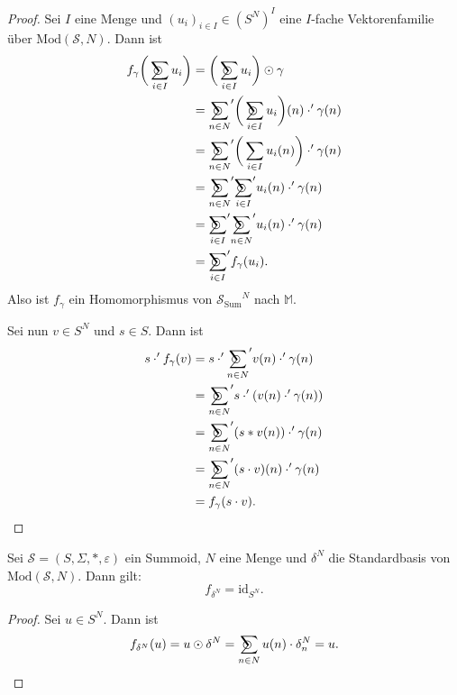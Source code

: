 \documentclass{article}
\DeclareMathOperator*{\sumcirc}{%
  \ThisStyle{\mathop{\ensurestackMath{\stackinset{c}{-1.5\LMpt}{c}{}{%
  \rotatebox[origin=lb]{-90}{$\SavedStyle\scalerel*{\bm\Circle}{%
  i}$}}{\SavedStyle\sum}}}}}
\begin{document}
\begin{proof}
  Sei $I$ eine Menge und $(u_i)_{i \in I} \in (S^N)^I$ eine $I$-fache Vektorenfamilie über $\text{Mod}(\mathcal{S}, N)$.
  Dann ist
  \begin{align*}
    f_\gamma\bigg(\sumcirc_{i \in I} u_i\bigg)
    &= \bigg(\sumcirc_{i \in I} u_i\bigg) \odot \gamma \\
    &= {\sumcirc_{n \in N}}' \bigg(\sumcirc_{i \in I} u_i\bigg)(n) \cdot' \gamma(n) \\
    &= {\sumcirc_{n \in N}}' \bigg(\sum_{i \in I} u_i(n)\bigg) \cdot' \gamma(n) \\
    &= {\sumcirc_{n \in N}}' {\sumcirc_{i \in I}}' u_i(n) \cdot' \gamma(n) \\
    &= {\sumcirc_{i \in I}}' {\sumcirc_{n \in N}}' u_i(n) \cdot' \gamma(n) \\
    &= {\sumcirc_{i \in I}}' f_\gamma(u_i).
  \end{align*}
  Also ist $f_\gamma$ ein Homomorphismus von ${\mathcal{S}_\text{Sum}}^N$ nach $\mathbb{M}$.

  Sei nun $v \in S^N$ und $s \in S$.
  Dann ist
  \begin{align*}
    s \cdot ' f_\gamma(v)
    &= s \cdot' {\sumcirc_{n \in N}}' v(n) \cdot' \gamma(n) \\
    &= {\sumcirc_{n \in N}}' s \cdot' (v(n) \cdot' \gamma(n)) \\
    &= {\sumcirc_{n \in N}}' (s \ast v(n)) \cdot' \gamma(n) \\
    &= {\sumcirc_{n \in N}}' (s \cdot v)(n) \cdot' \gamma(n) \\
    &= f_\gamma(s \cdot v).
  \end{align*}
\end{proof}

\begin{theorem}\label{Theorem_DeltaNIdSN}
  Sei $\mathcal{S} = (S, \Sigma, \ast, \varepsilon)$ ein Summoid, $N$ eine Menge und $\delta^N$
  die Standardbasis von $\text{Mod}(\mathcal{S}, N)$.
  Dann gilt:
  \begin{equation*}
    f_{\delta^N} = \text{id}_{S^N}.
  \end{equation*}
\end{theorem}
\begin{proof}
  Sei $u \in S^N$. Dann ist
  \begin{align*}
    f_{\delta^N}(u)
    = u \odot \delta^N
    = \sumcirc_{n \in N} u(n) \cdot \delta^N_n
    = u.
  \end{align*}
\end{proof}
\end{document}
